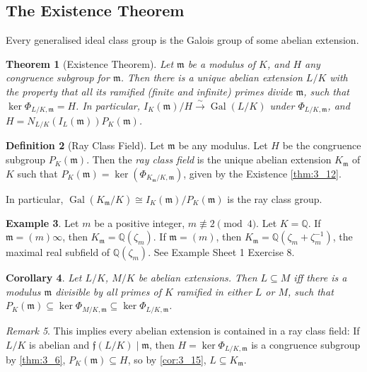 \documentclass[11pt]{article}
\theoremstyle{definition}
\newtheorem{definition}{Definition}[section]
\newtheorem{example}[definition]{Example}
\theoremstyle{plain}
\newtheorem{theorem}[definition]{Theorem}
\newtheorem{corollary}[definition]{Corollary}
\theoremstyle{remark}
\newtheorem{remark}[definition]{Remark}
\DeclareMathOperator{\Gal}{Gal}
\newcommand{\QQ}{\mathbb{Q}}
\newcommand{\ff}{\mathfrak{f}}
\newcommand{\fm}{\mathfrak{m}}
\begin{document}
\subsection{The Existence Theorem}

Every generalised ideal class group is the Galois group of some abelian extension.

\begin{theorem}[Existence Theorem]\label{thm:3_12}
    Let $\fm$ be a modulus of $K$, and $H$ any congruence subgroup for $\fm$. Then there is a unique abelian extension $L/K$ with the property that all its ramified (finite and infinite) primes divide $\fm$, such that $\ker \Phi_{L/K, \fm} = H$. In particular, $I_K(\fm) / H \xrightarrow{\sim} \Gal(L/K)$ under $\Phi_{L/K, \fm}$, and $H = N_{L/K}(I_L(\fm)) P_K(\fm)$.
\end{theorem}

\begin{definition}[Ray Class Field]\label{def:3_13}
    Let $\fm$ be any modulus. Let $H$ be the congruence subgroup $P_K(\fm)$. Then the \emph{ray class field} is the unique abelian extension $K_\fm$ of $K$ such that $P_K(\fm) = \ker(\Phi_{K_\fm / K, \fm})$, given by the Existence \autoref{thm:3_12}.

    In particular, $\Gal(K_\fm / K) \cong I_K(\fm)/P_K(\fm)$ is the ray class group.
\end{definition}

\begin{example}\label{eg:3_14}
    Let $m$ be a positive integer, $m \not\equiv 2 \pmod{4}$. Let $K = \QQ$. If $\fm = (m) \infty$, then $K_\fm = \QQ(\zeta_m)$. If $\fm = (m)$, then $K_\fm = \QQ(\zeta_m + \zeta_m^{-1})$, the maximal real subfield of $\QQ(\zeta_m)$. See Example Sheet 1 Exercise 8.
\end{example}

\begin{corollary}\label{cor:3_15}
    Let $L/K$, $M/K$ be abelian extensions. Then $L \subseteq M$ iff there is a modulus $\fm$ divisible by all primes of $K$ ramified in either $L$ or $M$, such that $P_K(\fm) \subseteq \ker \Phi_{M/K, \fm} \subseteq \ker \Phi_{L/K, \fm}$.
\end{corollary}

\begin{remark}\label{rem:3_16}
    This implies every abelian extension is contained in a ray class field: If $L/K$ is abelian and $\ff(L/K) \mid \fm$, then $H = \ker \Phi_{L/K, \fm}$ is a congruence subgroup by \autoref{thm:3_6}, $P_K(\fm) \subseteq H$, so by \autoref{cor:3_15}, $L \subseteq K_\fm$.
\end{remark}
\end{document}
